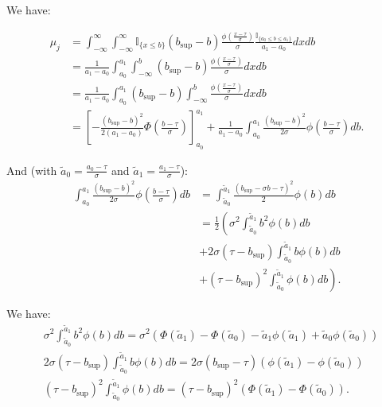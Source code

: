 \documentclass[11pt]{article}
\begin{document}
We have:

\begin{align*}
  \mu_j &= \int_{-\infty}^{\infty}\int_{-\infty}^{\infty} \mathbb{I}_{\{x \leq b\}}(b_{\sup}-b) \frac{\phi(\frac{x - \tau}{\sigma})}{\sigma}\frac{\mathbb{I}_{\{a_0 \leq b \leq a_1\}}}{a_1 - a_0} dx db \\
  & = \frac{1}{a_1 - a_0}\int_{a_0}^{a_1}\int_{-\infty}^{b} (b_{\sup}-b) \frac{\phi\left(\frac{x - \tau}{\sigma}\right)}{\sigma} dx db \\
  & = \frac{1}{a_1 - a_0}\int_{a_0}^{a_1} (b_{\sup}-b) \int_{-\infty}^{b} \frac{\phi\left(\frac{x - \tau}{\sigma}\right)}{\sigma} dx db \\
  & = \left[- \frac{(b_{\sup}-b)^2}{2 (a_1 - a_0)} \Phi\left(\frac{b - \tau}{\sigma}\right) \right]_{a_0}^{a_1} + \frac{1}{a_1 - a_0}\int_{a_0}^{a_1}  \frac{(b_{\sup}-b)^2}{2 \sigma} \phi\left(\frac{b - \tau}{\sigma}\right)db.
\end{align*}

And (with $\tilde{a}_0 = \frac{a_{0} - \tau}{\sigma} $ and $\tilde{a}_1 = \frac{a_{1} - \tau}{\sigma}$):
\begin{align*}
  \int_{a_0}^{a_1}  \frac{(b_{\sup}-b)^2}{2 \sigma} \phi\left(\frac{b - \tau}{\sigma}\right)db & = \int_{\tilde{a}_0}^{\tilde{a}_1}  \frac{(b_{\sup}- \sigma b - \tau)^2}{2} \phi\left(b\right)db \\
  & = \frac{1}{2}\left(\sigma^2\int_{\tilde{a}_0}^{\tilde{a}_1} b^2 \phi\left(b\right)db\right. \\
  & + 2 \sigma (\tau - b_{\sup})\int_{\tilde{a}_0}^{\tilde{a}_1} b \phi\left(b\right)db \\
  & + \left.(\tau - b_{\sup})^2 \int_{\tilde{a}_0}^{\tilde{a}_1} \phi\left(b\right)db \right).
\end{align*}

We have:
\begin{align*}
  &\sigma^2 \int_{\tilde{a}_0}^{\tilde{a}_1} b^2 \phi(b)db = \sigma^2 \left( \Phi\left(\tilde{a}_1\right) -  \Phi\left(\tilde{a}_0\right) - \tilde{a}_1 \phi\left(\tilde{a}_1\right) + \tilde{a}_0 \phi\left(\tilde{a}_0\right)\right)\\
  &2 \sigma (\tau - b_{\sup}) \int_{\tilde{a}_0}^{\tilde{a}_1} b \phi(b)db = 2 \sigma (b_{\sup} - \tau) \left( \phi\left(\tilde{a}_1\right) - \phi\left(\tilde{a}_0\right)\right)\\
  &(\tau - b_{\sup})^2 \int_{\tilde{a}_0}^{\tilde{a}_1} \phi(b)db = (\tau - b_{\sup})^2 \left(\Phi\left(\tilde{a}_1\right) - \Phi\left(\tilde{a}_0\right) \right).
\end{align*}
\end{document}
